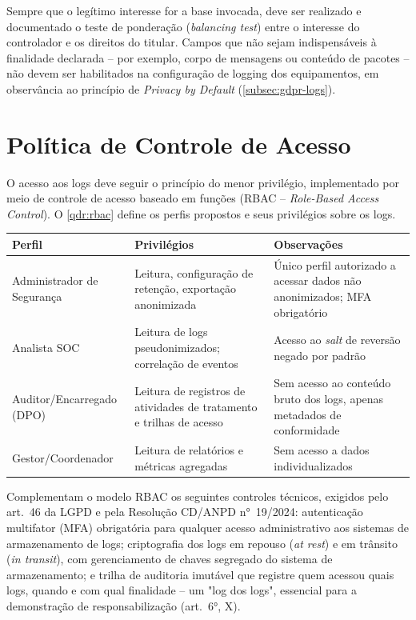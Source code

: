 Sempre que o legítimo interesse for a base invocada, deve ser realizado e documentado o teste de ponderação (\textit{balancing test}) entre o interesse do controlador e os direitos do titular. Campos que não sejam indispensáveis à finalidade declarada -- por exemplo, corpo de mensagens ou conteúdo de pacotes -- não devem ser habilitados na configuração de logging dos equipamentos, em observância ao princípio de \textit{Privacy by Default} (\autoref{subsec:gdpr-logs}).

\section{Política de Controle de Acesso}
\label{sec:politica-acesso}

O acesso aos logs deve seguir o princípio do menor privilégio, implementado por meio de controle de acesso baseado em funções (RBAC -- \textit{Role-Based Access Control}). O \autoref{qdr:rbac} define os perfis propostos e seus privilégios sobre os logs.

\begin{quadro}[htb]
    \caption{\label{qdr:rbac}Perfis de acesso RBAC para logs de infraestrutura}
    \begin{tabular}{|p{3cm}|p{5cm}|p{5.8cm}|}
        \hline
        \textbf{Perfil} & \textbf{Privilégios} & \textbf{Observações} \\
        \hline
        Administrador de Segurança & Leitura, configuração de retenção, exportação anonimizada & Único perfil autorizado a acessar dados não anonimizados; MFA obrigatório \\
        \hline
        Analista SOC & Leitura de logs pseudonimizados; correlação de eventos & Acesso ao \textit{salt} de reversão negado por padrão \\
        \hline
        Auditor/Encarregado (DPO) & Leitura de registros de atividades de tratamento e trilhas de acesso & Sem acesso ao conteúdo bruto dos logs, apenas metadados de conformidade \\
        \hline
        Gestor/Coordenador & Leitura de relatórios e métricas agregadas & Sem acesso a dados individualizados \\
        \hline
    \end{tabular}
\end{quadro}

Complementam o modelo RBAC os seguintes controles técnicos, exigidos pelo art.\ 46 da LGPD e pela Resolução CD/ANPD n°~19/2024: autenticação multifator (MFA) obrigatória para qualquer acesso administrativo aos sistemas de armazenamento de logs; criptografia dos logs em repouso (\textit{at rest}) e em trânsito (\textit{in transit}), com gerenciamento de chaves segregado do sistema de armazenamento; e trilha de auditoria imutável que registre quem acessou quais logs, quando e com qual finalidade -- um "log dos logs", essencial para a demonstração de responsabilização (art.\ 6°, X).

